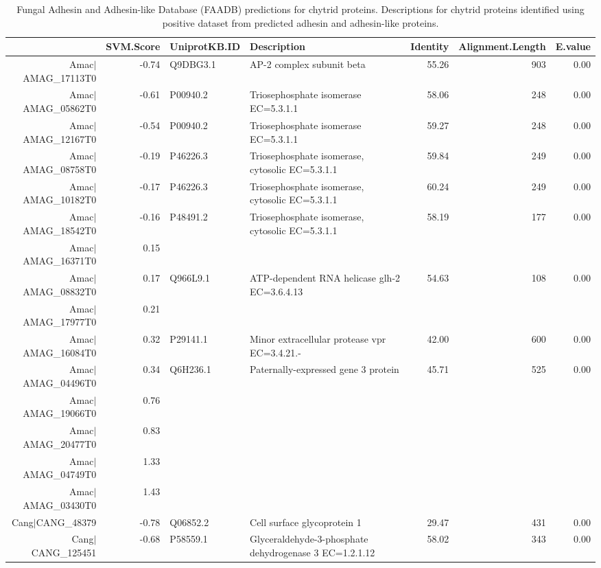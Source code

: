 \begin{table}[hp]
\caption[FAADB predictions for chytrid proteins]{Fungal Adhesin and Adhesin-like Database (FAADB) predictions for chytrid proteins. Descriptions for chytrid proteins identified using positive dataset from predicted adhesin and adhesin-like proteins.} 
\label{tab:ChClat_FAADB}
\begin{tabular}{rrllrrr}
  \hline
\hline
 & SVM.Score & UniprotKB.ID & Description & Identity & Alignment.Length & E.value \\ 
  \hline
Amac$|$AMAG\_17113T0 & -0.74 & Q9DBG3.1 & AP-2 complex subunit beta & 55.26 & 903 & 0.00 \\ 
  Amac$|$AMAG\_05862T0 & -0.61 & P00940.2 & Triosephosphate isomerase EC=5.3.1.1 & 58.06 & 248 & 0.00 \\ 
  Amac$|$AMAG\_12167T0 & -0.54 & P00940.2 & Triosephosphate isomerase EC=5.3.1.1 & 59.27 & 248 & 0.00 \\ 
  Amac$|$AMAG\_08758T0 & -0.19 & P46226.3 & Triosephosphate isomerase, cytosolic EC=5.3.1.1 & 59.84 & 249 & 0.00 \\ 
  Amac$|$AMAG\_10182T0 & -0.17 & P46226.3 & Triosephosphate isomerase, cytosolic EC=5.3.1.1 & 60.24 & 249 & 0.00 \\ 
  Amac$|$AMAG\_18542T0 & -0.16 & P48491.2 & Triosephosphate isomerase, cytosolic EC=5.3.1.1 & 58.19 & 177 & 0.00 \\ 
  Amac$|$AMAG\_16371T0 & 0.15 &  &  &  &  &  \\ 
  Amac$|$AMAG\_08832T0 & 0.17 & Q966L9.1 & ATP-dependent RNA helicase glh-2 EC=3.6.4.13 & 54.63 & 108 & 0.00 \\ 
  Amac$|$AMAG\_17977T0 & 0.21 &  &  &  &  &  \\ 
  Amac$|$AMAG\_16084T0 & 0.32 & P29141.1 & Minor extracellular protease vpr EC=3.4.21.- & 42.00 & 600 & 0.00 \\ 
  Amac$|$AMAG\_04496T0 & 0.34 & Q6H236.1 & Paternally-expressed gene 3 protein & 45.71 & 525 & 0.00 \\ 
  Amac$|$AMAG\_19066T0 & 0.76 &  &  &  &  &  \\ 
  Amac$|$AMAG\_20477T0 & 0.83 &  &  &  &  &  \\ 
  Amac$|$AMAG\_04749T0 & 1.33 &  &  &  &  &  \\ 
  Amac$|$AMAG\_03430T0 & 1.43 &  &  &  &  &  \\ 
  Cang$|$CANG\_48379 & -0.78 & Q06852.2 & Cell surface glycoprotein 1 & 29.47 & 431 & 0.00 \\ 
  Cang$|$CANG\_125451 & -0.68 & P58559.1 & Glyceraldehyde-3-phosphate dehydrogenase 3 EC=1.2.1.12 & 58.02 & 343 & 0.00 \\ 

\end{tabular}
\end{table}
